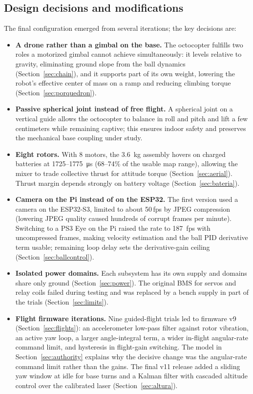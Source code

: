 \subsection{Design decisions and modifications}
The final configuration emerged from several iterations; the key decisions are:
\begin{itemize}
  \item \textbf{A drone rather than a gimbal on the base.} The octocopter fulfills two roles a motorized gimbal cannot achieve simultaneously: it levels relative to gravity, eliminating ground slope from the ball dynamics (Section~\ref{sec:chain}), and it supports part of its own weight, lowering the robot's effective center of mass on a ramp and reducing climbing torque (Section~\ref{sec:porquedron}).
  \item \textbf{Passive spherical joint instead of free flight.} A spherical joint on a vertical guide allows the octocopter to balance in roll and pitch and lift a few centimeters while remaining captive; this ensures indoor safety and preserves the mechanical base coupling under study.
  \item \textbf{Eight rotors.} With 8 motors, the \SI{3.6}{\kilo\gram} assembly hovers on charged batteries at 1725--\SI{1775}{\micro\second} (68--74\% of the usable map range), allowing the mixer to trade collective thrust for attitude torque (Section~\ref{sec:aerial}). Thrust margin depends strongly on battery voltage (Section~\ref{sec:bateria}).
  \item \textbf{Camera on the Pi instead of on the ESP32.} The first version used a camera on the ESP32-S3, limited to about 50\,fps by JPEG compression (lowering JPEG quality caused hundreds of corrupt frames per minute). Switching to a PS3 Eye on the Pi raised the rate to \SI{187}{fps} with uncompressed frames, making velocity estimation and the ball PID derivative term usable; remaining loop delay sets the derivative-gain ceiling (Section~\ref{sec:ballcontrol}).
  \item \textbf{Isolated power domains.} Each subsystem has its own supply and domains share only ground (Section~\ref{sec:power}). The original BMS for servos and relay coils failed during testing and was replaced by a bench supply in part of the trials (Section~\ref{sec:limits}).
  \item \textbf{Flight firmware iterations.} Nine guided-flight trials led to firmware v9 (Section~\ref{sec:flights}): an accelerometer low-pass filter against rotor vibration, an active yaw loop, a larger angle-integral term, a wider in-flight angular-rate command limit, and hysteresis in flight-gain switching. The model in Section~\ref{sec:authority} explains why the decisive change was the angular-rate command limit rather than the gains. The final v11 release added a sliding yaw window at idle for base turns and a Kalman filter with cascaded altitude control over the calibrated laser (Section~\ref{sec:altura}).
\end{itemize}
